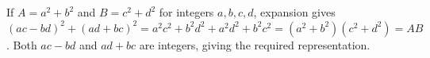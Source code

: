 If $A=a^2+b^2$ and $B=c^2+d^2$ for integers $a,b,c,d$, expansion gives $(ac-bd)^2+(ad+bc)^2=a^2c^2+b^2d^2+a^2d^2+b^2c^2=(a^2+b^2)(c^2+d^2)=AB$. Both $ac-bd$ and $ad+bc$ are integers, giving the required representation.
